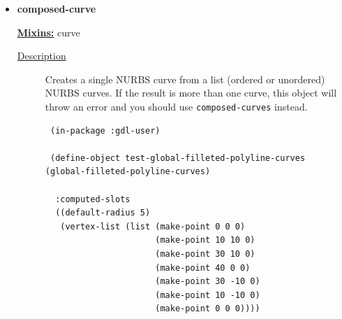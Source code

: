 \documentclass [11pt]{book}
\begin{document}
\begin{itemize}
\begin{figure}
\label{fig:compatible-surfaces}

\end{figure}





\textbf{
\underline{Input slots (required):}}

\begin{description}

\item [Surface-list]
\emph{List}

 A list of Gdl surface objects.




\end{description}







\item {}
\label{prim:composed-curve}
\textbf{composed-curve}


\textbf{
\underline{Mixins:}} curve





\begin{description}

\item [
\underline{Description}]


Creates a single NURBS curve from a list (ordered or unordered) NURBS curves. 
If the result is more than one curve, this object will throw an error and you should use \texttt{composed-curves}
instead.



\end{description}




\begin{figure}
\begin{lrbox}{\boxedverb}
\begin{minipage}{\linewidth}
{\small

\begin{verbatim}
 (in-package :gdl-user)

 (define-object test-global-filleted-polyline-curves (global-filleted-polyline-curves)
                    
  :computed-slots
  ((default-radius 5)
   (vertex-list (list (make-point 0 0 0)
                      (make-point 10 10 0)
                      (make-point 30 10 0)
                      (make-point 40 0 0)
                      (make-point 30 -10 0)
                      (make-point 10 -10 0)
                      (make-point 0 0 0))))


\end{verbatim}}
\end{minipage}
\end{lrbox}
\end{figure}
\end{itemize}
\end{document}
